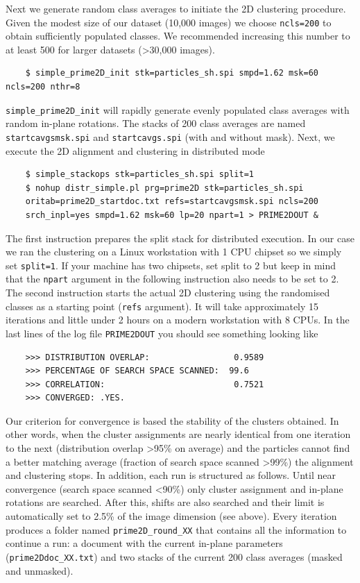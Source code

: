 \documentclass[a4paper,11pt]{article}
\newcommand{\prgname}[1]{\textcolor{NavyBlue}{\texttt{#1}}}
\begin{document}
Next we generate random class averages to initiate the 2D clustering procedure. Given the modest size of our dataset (10,000 images) we choose \texttt{ncls=200} to obtain sufficiently populated classes. We recommended increasing this number to at least 500 for larger datasets (>30,000 images).
\begin{verbatim}
    $ simple_prime2D_init stk=particles_sh.spi smpd=1.62 msk=60 ncls=200 nthr=8
\end{verbatim}
\prgname{simple\_prime2D\_init} will rapidly generate evenly populated class averages with random in-plane rotations. The stacks of 200 class averages are named \texttt{startcavgsmsk.spi} and \texttt{startcavgs.spi} (with and without mask). Next, we execute the 2D alignment and clustering in distributed mode
\begin{verbatim}
    $ simple_stackops stk=particles_sh.spi split=1
    $ nohup distr_simple.pl prg=prime2D stk=particles_sh.spi
    oritab=prime2D_startdoc.txt refs=startcavgsmsk.spi ncls=200
    srch_inpl=yes smpd=1.62 msk=60 lp=20 npart=1 > PRIME2DOUT &
\end{verbatim}
The first instruction prepares the split stack for distributed execution. In our case we ran the clustering on a Linux workstation with 1 CPU chipset so we simply set \texttt{split=1}. If your machine has two chipsets, set split to 2 but keep in mind that the \texttt{npart} argument in the following instruction also needs to be set to 2. The second instruction starts the actual 2D clustering using the randomised classes as a starting point (\texttt{refs} argument). It will take approximately 15 iterations and little under 2 hours on a modern workstation with 8 CPUs. In the last lines of the log file \texttt{PRIME2DOUT} you should see something looking like
\begin{verbatim}
    >>> DISTRIBUTION OVERLAP:                 0.9589
    >>> PERCENTAGE OF SEARCH SPACE SCANNED:  99.6
    >>> CORRELATION:                          0.7521
    >>> CONVERGED: .YES.
\end{verbatim}
Our criterion for convergence is based the stability of the clusters obtained. In other words, when the cluster assignments are nearly identical from one iteration to the next (distribution overlap  >95\% on average) and the particles cannot find a better matching average (fraction of search space scanned >99\%) the alignment and clustering stops. In addition, each run is structured as follows. Until near convergence (search space scanned <90\%) only cluster assignment and in-plane rotations are searched. After this, shifts are also searched and their limit is automatically set to 2.5\% of the image dimension (see above). Every iteration produces a folder named \texttt{prime2D\_round\_XX} that contains all the information to continue a run: a document with the current in-plane parameters (\texttt{prime2Ddoc\_XX.txt}) and two stacks of the current 200 class averages (masked and unmasked).
\end{document}
